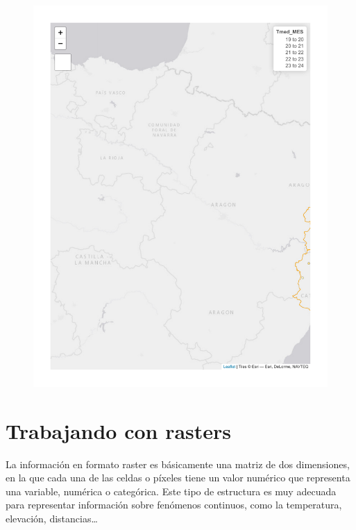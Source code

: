 \documentclass[
  letterpaper,
  DIV=11,
  numbers=noendperiod]{scrreprt}
\begin{document}
\begin{figure}[H]

{\centering \includegraphics{03_DatosEspaciales_files/figure-pdf/unnamed-chunk-23-1.pdf}

}

\end{figure}

\hypertarget{trabajando-con-rasters}{%
\section{Trabajando con rasters}\label{trabajando-con-rasters}}

La información en formato raster es básicamente una matriz de dos
dimensiones, en la que cada una de las celdas o píxeles tiene un valor
numérico que representa una variable, numérica o categórica. Este tipo
de estructura es muy adecuada para representar información sobre
fenómenos continuos, como la temperatura, elevación, distancias\ldots{}
\end{document}

